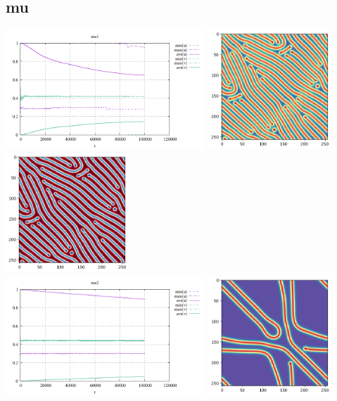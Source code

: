 \subsection*{mu}
\begin{center}
\includegraphics[height=4.5cm]{python_codes/fieldstone_171/results/mu1_stats}
\includegraphics[height=4.5cm]{python_codes/fieldstone_171/results/mu1_solution_final_u.png}
\includegraphics[height=4.5cm]{python_codes/fieldstone_171/results/mu1_solution_final_v.png}\\
\includegraphics[height=4.5cm]{python_codes/fieldstone_171/results/mu2_stats}
\includegraphics[height=4.5cm]{python_codes/fieldstone_171/results/mu2_solution_final_u.png}

\end{center}
